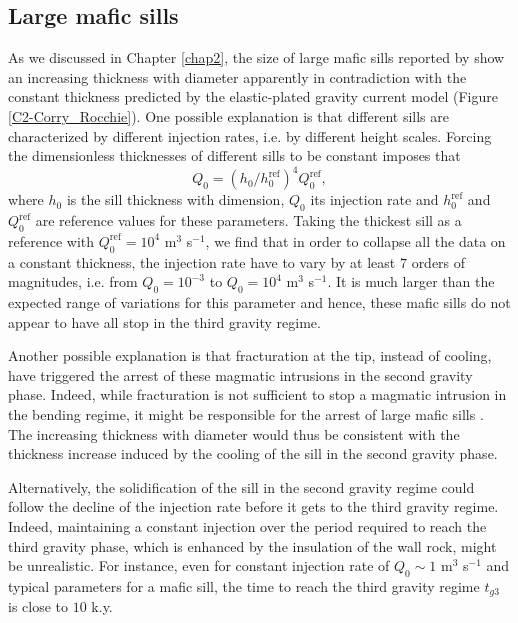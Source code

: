 \subsection{Large mafic sills}
\label{sec:large-mafic-sill}

As we discussed in Chapter \ref{chap2},  the size of large mafic sills
reported  by  \citet{Cruden:tg}  show  an  increasing  thickness  with
diameter  apparently  in  contradiction with  the  constant  thickness
predicted  by   the  elastic-plated  gravity  current   model  (Figure
\ref{C2-Corry_Rocchie}).  One  possible explanation is  that different
sills  are  characterized  by  different  injection  rates,  i.e.   by
different  height scales.   Forcing the  dimensionless thicknesses  of
different sills to be constant imposes that
\begin{equation}
  Q_0 = (h_0/h_0^{\text{ref}})^4Q_0^{\text{ref}},
\end{equation}
where $h_0$ is the sill  thickness with dimension, $Q_0$ its injection
rate  and  $h_0^{\text{ref}}$  and  $Q_0^{\text{ref}}$  are  reference
values for these parameters.  Taking  the thickest sill as a reference
with $Q_0^{\text{ref}} =  10^4$ m$^3$ s$^{-1}$, we find  that in order
to collapse all  the data on a constant thickness,  the injection rate
have  to  vary by  at  least  $7$  orders  of magnitudes,  i.e.   from
$Q_0=10^{-3}$ to $Q_0= 10^{4}$ m$^3$  s$^{-1}$. It is much larger than
the expected range  of variations for this parameter  and hence, these
mafic  sills do  not appear  to  have all  stop in  the third  gravity
regime.

Another possible explanation is that  fracturation at the tip, instead
of cooling, have triggered the  arrest of these magmatic intrusions in
the  second   gravity  phase.   Indeed,  while   fracturation  is  not
sufficient  to stop  a magmatic  intrusion in  the bending  regime, it
might   be  responsible   for  the   arrest  of   large  mafic   sills
\citep{Michaut:2011kg}.  The increasing  thickness with diameter would
thus be consistent with the  thickness increase induced by the cooling
of the sill in the second gravity phase.

Alternatively, the  solidification of the  sill in the  second gravity
regime could follow  the decline of the injection rate  before it gets
to the third gravity regime.  Indeed, maintaining a constant injection
over the  period required to reach  the third gravity phase,  which is
enhanced by the insulation of the wall rock, might be unrealistic. For
instance,  even  for constant  injection  rate  of $Q_0\sim  1$  m$^3$
s$^{-1}$ and  typical parameters for a  mafic sill, the time  to reach
the third gravity regime $t_{g3}$ is close to $10$ k.y.

